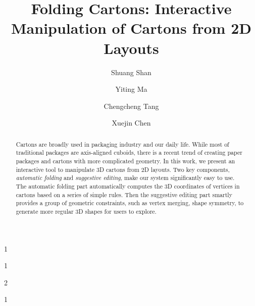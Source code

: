 \documentclass[submission]{gmp2018}
\begin{document}
%
%
\title{Folding Cartons: Interactive Manipulation of Cartons from 2D Layouts}

%
%

%
%
\author{Shuang Shan}{1}
\author{Yiting Ma}{1}
\author{Chengcheng Tang}{2}
\author{Xuejin Chen}{1}

%
%

%
%
 



\newcommand{\comments}[1]{}
\newcommand{\cxj}[1]{\textcolor{red}{(xuejin:#1)}}
\newcommand{\xjmd}[1]{\textcolor{purple}{#1}}
\newcommand{\vo}{\hat{\mathbf{v}}}
\newcommand{\vn}{\mathbf{v}}


\maketitle

\begin{abstract}
Cartons are broadly used in packaging industry and our daily life. While most of traditional packages are axis-aligned cuboids, there is a recent trend of creating paper packages and cartons with more complicated geometry. In this work, we present an interactive tool to manipulate 3D cartons from 2D layouts. Two key components, \emph{automatic folding} and \emph{suggestive editing}, make our system significantly easy to use. 
The automatic folding part automatically computes the 3D coordinates of vertices in cartons based on a series of simple rules. Then the suggestive editing part smartly provides a group of geometric constraints, such as vertex merging, shape symmetry, to generate more regular 3D shapes for users to explore.
\end{abstract}







\end{document}

